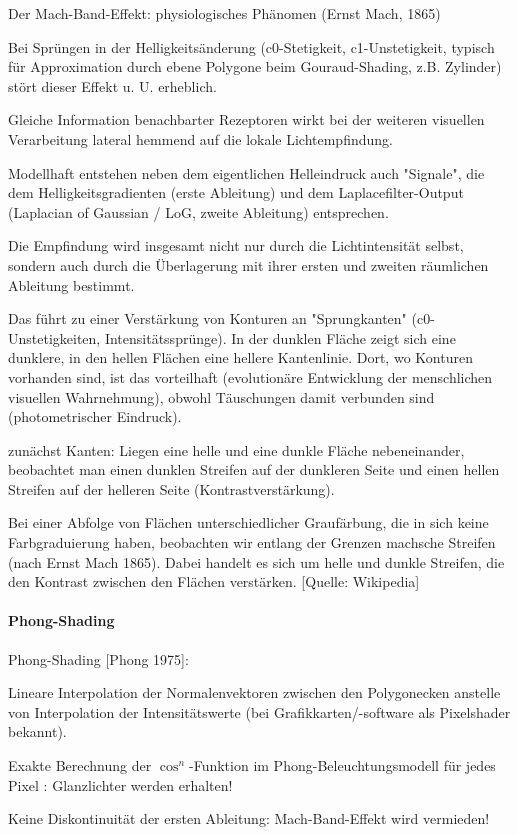 \documentclass[landscape]{article}
\begin{document}
\begin{multicols}{3}
  Der Mach-Band-Effekt: physiologisches Phänomen (Ernst Mach, 1865)
  \begin{itemize*}
    \item Bei Sprüngen in der Helligkeitsänderung (c0-Stetigkeit, c1-Unstetigkeit, typisch für Approximation durch ebene Polygone beim Gouraud-Shading, z.B. Zylinder) stört dieser Effekt u. U. erheblich.
    \item Gleiche Information benachbarter Rezeptoren wirkt bei der weiteren visuellen Verarbeitung lateral hemmend auf die lokale Lichtempfindung.
    \item Modellhaft entstehen neben dem eigentlichen Helleindruck auch "Signale", die dem Helligkeitsgradienten (erste Ableitung) und dem Laplacefilter-Output (Laplacian of Gaussian / LoG, zweite Ableitung) entsprechen.
    \item Die Empfindung wird insgesamt nicht nur durch die Lichtintensität selbst, sondern auch durch die Überlagerung mit ihrer ersten und zweiten räumlichen Ableitung bestimmt.
    \item Das führt zu einer Verstärkung von Konturen an "Sprungkanten" (c0-Unstetigkeiten, Intensitätssprünge). In der dunklen Fläche zeigt sich eine dunklere, in den hellen Flächen eine hellere Kantenlinie. Dort, wo Konturen vorhanden sind, ist das vorteilhaft (evolutionäre Entwicklung der menschlichen visuellen Wahrnehmung), obwohl Täuschungen damit verbunden sind (photometrischer Eindruck).
    \item zunächst Kanten: Liegen eine helle und eine dunkle Fläche nebeneinander, beobachtet man einen dunklen Streifen auf der dunkleren Seite und einen hellen Streifen auf der helleren Seite (Kontrastverstärkung).
    \item Bei einer Abfolge von Flächen unterschiedlicher Graufärbung, die in sich keine Farbgraduierung haben, beobachten wir entlang der Grenzen machsche Streifen (nach Ernst Mach 1865). Dabei handelt es sich um helle und dunkle Streifen, die den Kontrast zwischen den Flächen verstärken. [Quelle: Wikipedia]
  \end{itemize*}
  
  \paragraph{Phong-Shading}
  Phong-Shading [Phong 1975]:
  \begin{itemize*}
    \item Lineare Interpolation der Normalenvektoren zwischen den Polygonecken anstelle von Interpolation der Intensitätswerte (bei Grafikkarten/-software als Pixelshader bekannt).
    \item Exakte Berechnung der $\cos^n$-Funktion im Phong-Beleuchtungsmodell für jedes Pixel : Glanzlichter werden erhalten!
    \item Keine Diskontinuität der ersten Ableitung: Mach-Band-Effekt wird vermieden!
  \end{itemize*}
  

\end{multicols}
\end{document}

